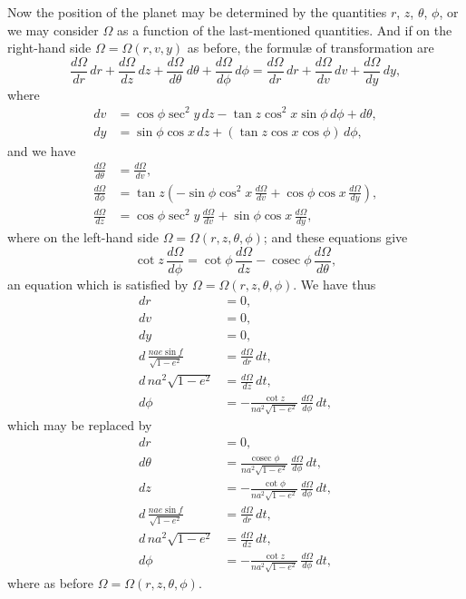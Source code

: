 \documentclass[11pt]{article}
\providecommand{\cosec}{\mathop{\mathrm{cosec}}}
\begin{document}
Now the position of the planet may be determined by the quantities $r$, $z$, $\theta$, $\phi$, or we may consider $\Omega$ as a function of the last-mentioned quantities. And if on the right-hand side $\Omega = \Omega(r,v,y)$ as before, the formul{\ae} of transformation are
\[
\frac{d\Omega}{dr}\,dr + \frac{d\Omega}{dz}\,dz + \frac{d\Omega}{d\theta}\,d\theta + \frac{d\Omega}{d\phi}\,d\phi = \frac{d\Omega}{dr}\,dr + \frac{d\Omega}{dv}\,dv + \frac{d\Omega}{dy}\,dy,
\]
where
\begin{align*}
dv &= \cos\phi\sec^2 y\,dz - \tan z \cos^2 x \sin\phi\,d\phi + d\theta,\\
dy &= \sin\phi\cos x\,dz + (\tan z \cos x \cos\phi)\,d\phi,
\end{align*}
and we have
\begin{align*}
\frac{d\Omega}{d\theta} &= \frac{d\Omega}{dv},\\
\frac{d\Omega}{d\phi} &= \tan z\left(-\sin\phi\cos^2 x\,\frac{d\Omega}{dv} + \cos\phi\cos x\,\frac{d\Omega}{dy}\right),\\
\frac{d\Omega}{dz} &= \cos\phi\sec^2 y\,\frac{d\Omega}{dv} + \sin\phi\cos x\,\frac{d\Omega}{dy},
\end{align*}
where on the left-hand side $\Omega = \Omega(r,z,\theta,\phi)$; and these equations give
\[
\cot z\,\frac{d\Omega}{d\phi} = \cot\phi\,\frac{d\Omega}{dz} - \cosec\phi\,\frac{d\Omega}{d\theta},
\]
an equation which is satisfied by $\Omega = \Omega(r,z,\theta,\phi)$. We have thus
\begin{align*}
dr &= 0,\\
dv &= 0,\\
dy &= 0,\\
d\,\frac{nae\sin f}{\sqrt{1-e^2}} &= \frac{d\Omega}{dr}\,dt,\\
d\,na^2\sqrt{1-e^2} &= \frac{d\Omega}{dz}\,dt,\\
d\phi &= -\frac{\cot z}{na^2\sqrt{1-e^2}}\,\frac{d\Omega}{d\phi}\,dt,
\end{align*}
which may be replaced by
\begin{align*}
dr &= 0,\\
d\theta &= \frac{\cosec\phi}{na^2\sqrt{1-e^2}}\,\frac{d\Omega}{d\phi}\,dt,\\
dz &= -\frac{\cot\phi}{na^2\sqrt{1-e^2}}\,\frac{d\Omega}{d\phi}\,dt,\\
d\,\frac{nae\sin f}{\sqrt{1-e^2}} &= \frac{d\Omega}{dr}\,dt,\\
d\,na^2\sqrt{1-e^2} &= \frac{d\Omega}{dz}\,dt,\\
d\phi &= -\frac{\cot z}{na^2\sqrt{1-e^2}}\,\frac{d\Omega}{d\phi}\,dt,
\end{align*}
where as before $\Omega = \Omega(r,z,\theta,\phi)$.
\end{document}
